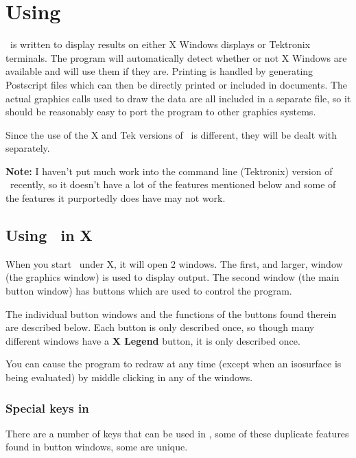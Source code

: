 \chapter{Using \viewprog}

\viewprog\ is written to display results on either X Windows displays
or Tektronix terminals.  The program will automatically detect whether
or not X Windows are available and will use them if they are.
Printing is handled by generating Postscript 
files which can then be directly printed or included in documents.
The actual graphics calls used to draw the data are all included in a
separate file, so it should be reasonably easy to port the program to
other graphics systems.

Since the use of the X and Tek versions of \viewprog\ is different,
they will be dealt with separately.

{\bf Note:}  I haven't put much work into the command line (Tektronix)
version of \viewprog\ recently, so it doesn't have a lot of the
features mentioned below and some of the features it purportedly does
have may not work.

\section{Using \viewprog\ in X}

When you start \viewprog\ under X, it will open 2 windows.  The first,
and larger, window (the graphics window) is used to display output.
The second window (the main button window) has buttons which are used
to control the program. 

The individual button windows and the functions of the buttons found
therein are described below.  Each button is only described once, so
though many different windows have a {\bf X Legend} button, it is only
described once. 

You can cause the program to redraw at any time (except when an
isosurface is being evaluated) by middle clicking in any of the
windows.

\subsection{Special keys in \viewprog}

There are a number of keys that can be used in \viewprog, some of
these duplicate features found in button windows, some are unique.

